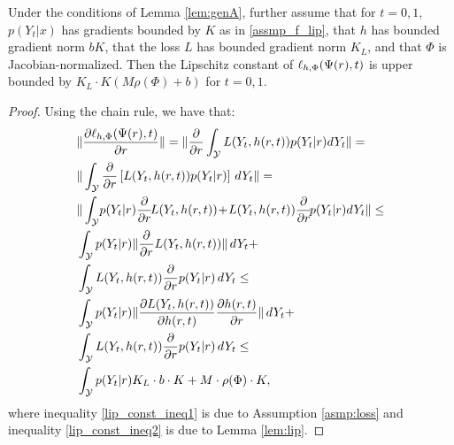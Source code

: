 \begin{thmapplem}\label{lem:errlip}
Under the conditions of Lemma \ref{lem:genA}, further assume that for $t=0,1$, $p(Y_t|x)$ has gradients bounded by $K$ as in \ref{assmp_f_lip}, that $h$ has bounded gradient norm $b K$, that the loss $L$ has bounded gradient norm $K_L$, and that $\Phi$ is Jacobian-normalized. Then the Lipschitz constant of $ \ell_{h,\Phi}(\Psi(r),t)$ is upper bounded by $K_L \cdot K \left(M \rho(\Phi) +  b \right)$ for $t=0,1$.
\end{thmapplem}
\begin{proof}
Using the chain rule, we have that:
\begin{align}
& \|\frac{\partial \ell_{h,\Phi}(\Psi(r),t)}{\partial r}\| =\| \frac{\partial}{\partial r} \int_\mathcal Y L(Y_t,h(r,t))  p(Y_t|r) dY_t \|= \nonumber \\
& \| \int_\mathcal Y \frac{\partial}{\partial r} \left[ L(Y_t,h(r,t))  p(Y_t|r)\right] \, dY_t \| = \nonumber \\
& \| \int_\mathcal Y \! p(Y_t|r)\frac{\partial}{\partial r} \! L(Y_t,h(r,t)) \!   +\! L(Y_t,h(r,t)) \frac{\partial}{\partial r} \! p(Y_t|r)  dY_t \|  \leq  \nonumber \\
& \int_\mathcal Y p(Y_t|r) \| \frac{\partial}{\partial r} L(Y_t,h(r,t)) \| \, dY_t + \nonumber\\
& \int_\mathcal Y  L(Y_t,h(r,t)) \frac{\partial}{\partial r} p(Y_t|r) \, dY_t \leq \label{lip_const_ineq1}\\
& \int_\mathcal Y p(Y_t|r) \| \frac{\partial L(Y_t,h(r,t))}{\partial h(r,t) }  \frac{\partial h(r,t)}{\partial r} \| \, dY_t + \nonumber\\
& \int_\mathcal Y  L(Y_t,h(r,t)) \frac{\partial}{\partial r} p(Y_t|r) \, dY_t \leq \label{lip_const_ineq2}\\
& \int_\mathcal Y p(Y_t|r) K_L \cdot b \cdot K + M \cdot \rho(\Phi) \cdot  K,
\end{align}
where inequality \ref{lip_const_ineq1} is due to Assumption \ref{asmp:loss} and inequality \ref{lip_const_ineq2} is due to Lemma \ref{lem:lip}.
\end{proof}



